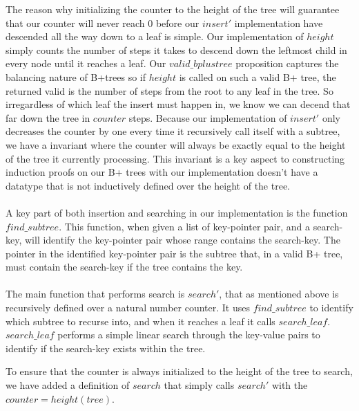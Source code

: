The reason why initializing the counter to the height of the tree will guarantee that our counter will never reach $0$ before our $insert'$ implementation have descended all the way down to a leaf is simple. Our implementation of $height$ simply counts the number of steps it takes to descend down the leftmost child in every node until it reaches a leaf. Our $valid\_bplustree$ proposition captures the balancing nature of B+trees so if $height$ is called on such a valid B+ tree, the returned valid is the number of steps from the root to any leaf in the tree. So irregardless of which leaf the insert must happen in, we know we can decend that far down the tree in $counter$ steps. Because our implementation of $insert'$ only decreases the counter by one every time it recursively call itself with a subtree, we have a invariant where the counter will always be exactly equal to the height of the tree it currently processing. This invariant is a key aspect to constructing induction proofs on our B+ trees with our implementation doesn't have a datatype that is not inductively defined over the height of the tree.

\paragraph{}
A key part of both insertion and searching in our implementation is the function $find\_subtree$. This function, when given a list of key-pointer pair, and a search-key, will identify the key-pointer pair whose range contains the search-key. The pointer in the identified key-pointer pair is the subtree that, in a valid B+ tree, must contain the search-key if the tree contains the key.

\paragraph{}
The main function that performs search is $search'$, that as mentioned above is recursively defined over a natural number counter. It uses $find\_subtree$ to identify which subtree to recurse into, and when it reaches a leaf it calls $search\_leaf$. $search\_leaf$ performs a simple linear search through the key-value pairs to identify if the search-key exists within the tree.

To ensure that the counter is always initialized to the height of the tree to search, we have added a definition of $search$ that simply calls $search'$ with the $counter = height(tree)$.

